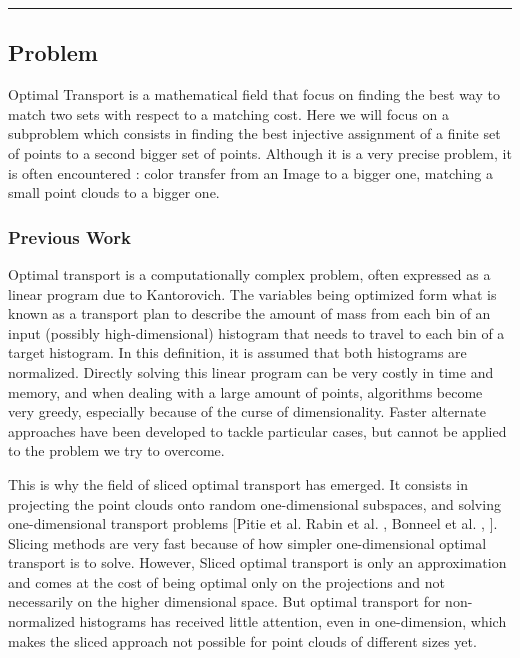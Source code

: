 \documentclass[a4paper,12pt]{article}
\begin{document}
\begin{center}
    \rule{4cm}{0.4pt}
\end{center}



\bigskip


\subsection*{Problem}

Optimal Transport is a mathematical field that focus on finding the best way to match two sets with respect to a matching cost. Here we will focus on a subproblem which consists in finding the best injective assignment of a finite set of points to a second bigger set of points. Although it is a very precise problem, it is often encountered : color transfer from an Image to a bigger one, matching a small point clouds to a bigger one. 

\subsubsection*{Previous Work}

Optimal transport is a computationally complex problem, often expressed as a linear program due to Kantorovich. The variables being optimized form what is known as a transport plan to describe the amount of mass from each bin of an input (possibly high-dimensional) histogram that needs to travel to each bin of a target histogram. In this definition, it is assumed that both histograms are normalized. Directly solving this linear program can be very costly in time and memory, and when dealing with a large amount of points, algorithms become very greedy, especially because of the curse of dimensionality. Faster alternate approaches have been developed to tackle particular cases, but cannot be applied to the problem we try to overcome.

This is why the field of sliced optimal transport has emerged. It consists in projecting the point clouds onto random one-dimensional subspaces, and solving one-dimensional transport problems [Pitie et al. Rabin et al. \cite{pitie2005n}, Bonneel et al. \cite{rabin2011wasserstein}, \cite{bonneel2015sliced}]. Slicing methods are very fast because of how simpler one-dimensional optimal transport is to solve. However, Sliced optimal transport is only an approximation and comes at the cost of being optimal only on the projections and not necessarily on the higher dimensional space.
  But optimal transport for non-normalized histograms has received little attention, even in one-dimension, which makes the sliced approach not possible for point clouds of different sizes yet.
 
\end{document}

